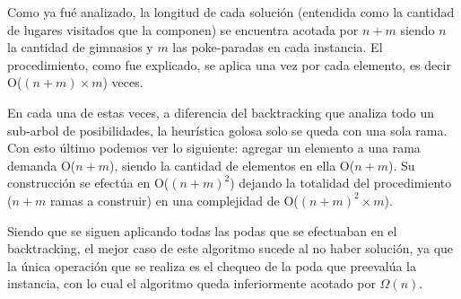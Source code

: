 Como ya fué analizado, la longitud de cada solución (entendida como la cantidad de lugares visitados que la componen) se encuentra acotada por $n + m$ siendo $n$ la cantidad de gimnasios y $m$ las poke-paradas en cada instancia. El procedimiento, como fue explicado, se aplica una vez por cada elemento, es decir O($(n+m) \times m$) veces.

En cada una de estas veces, a diferencia del backtracking que analiza todo un sub-arbol de posibilidades, la heur\'istica golosa solo se queda con una sola rama. Con esto último podemos ver lo siguiente: agregar un elemento a una rama demanda O($n+m$), siendo la cantidad de elementos en ella O($n+m$). Su construcción se efectúa en O($(n+m)^2$) dejando la totalidad del procedimiento ($n+m$ ramas a construir) en una complejidad de O($(n+m)^2 \times m$).

Siendo que se siguen aplicando todas las podas que se efectuaban en el backtracking, el mejor caso de este algoritmo sucede al no haber solución, ya que la única operación que se realiza es el chequeo de la poda que preevalúa la instancia, con lo cual el algoritmo queda inferiormente acotado por $\Omega(n)$.